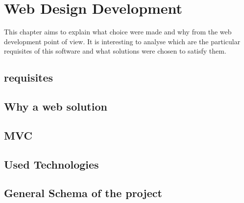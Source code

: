 
\chapter{Web Design Development} %

\label{Chapter 9} %


This chapter aims to explain what choice were made and why from the web development point of view. It is interesting to analyse which are the particular requisites of this software and what solutions were chosen to satisfy them. 

\section{requisites}


\section{Why a web solution}

\section{MVC}

\section{Used Technologies}

\section{General Schema of the project}

